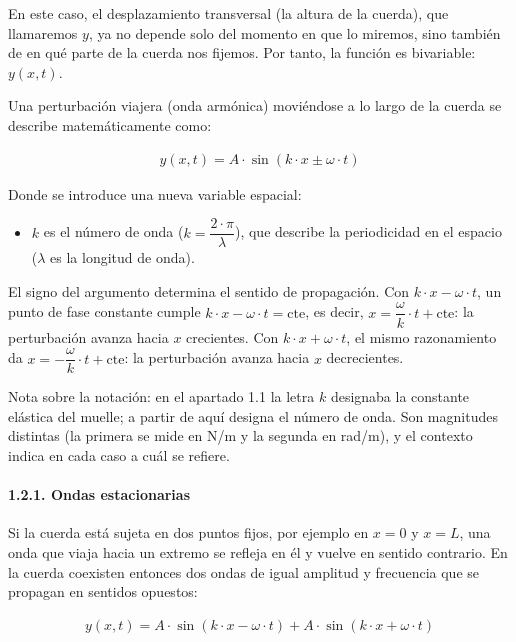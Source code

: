 \documentclass[
  spanish,
]{article}
\providecommand{\tightlist}{%
  \setlength{\itemsep}{0pt}\setlength{\parskip}{0pt}}
\begin{document}
En este caso, el desplazamiento transversal (la altura de la cuerda),
que llamaremos \(y\), ya no depende solo del momento en que lo miremos,
sino también de en qué parte de la cuerda nos fijemos. Por tanto, la
función es bivariable: \(y(x,t)\).

Una perturbación viajera (onda armónica) moviéndose a lo largo de la
cuerda se describe matemáticamente como:

\[
\begin{aligned}
y(x,t) = A \cdot \sin(k \cdot x \pm \omega \cdot t)
\end{aligned}
\]

Donde se introduce una nueva variable espacial:

\begin{itemize}
\tightlist
\item
  \(k\) es el número de onda (\(k = \dfrac{2 \cdot \pi}{\lambda}\)), que
  describe la periodicidad en el espacio (\(\lambda\) es la longitud de
  onda).
\end{itemize}

El signo del argumento determina el sentido de propagación. Con
\(k \cdot x - \omega \cdot t\), un punto de fase constante cumple
\(k \cdot x - \omega \cdot t = \text{cte}\), es decir,
\(x = \dfrac{\omega}{k} \cdot t + \text{cte}\): la perturbación avanza
hacia \(x\) crecientes. Con \(k \cdot x + \omega \cdot t\), el mismo
razonamiento da \(x = -\dfrac{\omega}{k} \cdot t + \text{cte}\): la
perturbación avanza hacia \(x\) decrecientes.

Nota sobre la notación: en el apartado 1.1 la letra \(k\) designaba la
constante elástica del muelle; a partir de aquí designa el número de
onda. Son magnitudes distintas (la primera se mide en N/m y la segunda
en rad/m), y el contexto indica en cada caso a cuál se refiere.

\paragraph{1.2.1. Ondas estacionarias}\label{ondas-estacionarias}

Si la cuerda está sujeta en dos puntos fijos, por ejemplo en \(x=0\) y
\(x=L\), una onda que viaja hacia un extremo se refleja en él y vuelve
en sentido contrario. En la cuerda coexisten entonces dos ondas de igual
amplitud y frecuencia que se propagan en sentidos opuestos:

\[
\begin{aligned}
y(x,t) = A \cdot \sin(k \cdot x - \omega \cdot t) + A \cdot \sin(k \cdot x + \omega \cdot t)
\end{aligned}
\]
\end{document}
